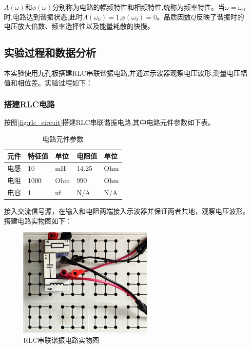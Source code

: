\documentclass[UTF8]{ctexart}
\begin{document}
$A(\omega)$和$\phi(\omega)$分别称为电路的幅频特性和相频特性,统称为频率特性。当$\omega=\omega_0$时,电路达到谐振状态,此时$A(\omega_0)=1$,$\phi(\omega_0)=0$。品质因数$Q$反映了谐振时的电压放大倍数、频率选择性以及能量耗散的快慢。

\subsection{实验过程和数据分析}
本实验使用九孔板搭建RLC串联谐振电路,并通过示波器观察电压波形,测量电压幅值和相位差。实验过程如下：
\subsubsection{搭建RLC电路}
按图\ref{fig:rlc_circuit}搭建RLC串联谐振电路,其中电路元件参数如下表。
\begin{table}[htbp]
\centering
\caption{电路元件参数}
\begin{tabular}{lllll}
\hline
元件&特征值&单位&电阻值&单位\\
\hline
电感&10&mH&14.25&Ohm\\
\hline
电阻&1000&Ohm&990&Ohm\\
\hline
电容&1&uf&N/A&N/A\\
\hline
\end{tabular}
\end{table}

接入交流信号源，在输入和电阻两端接入示波器并保证两者共地，观察电压波形。搭建电路实物图如下：
\newpage
\begin{figure}[htbp]
\centering
\includegraphics[width=0.6\textwidth]{circuit.jpg}
\caption{RLC串联谐振电路实物图}\label{fig:circuit}
\end{figure}
\end{document}
